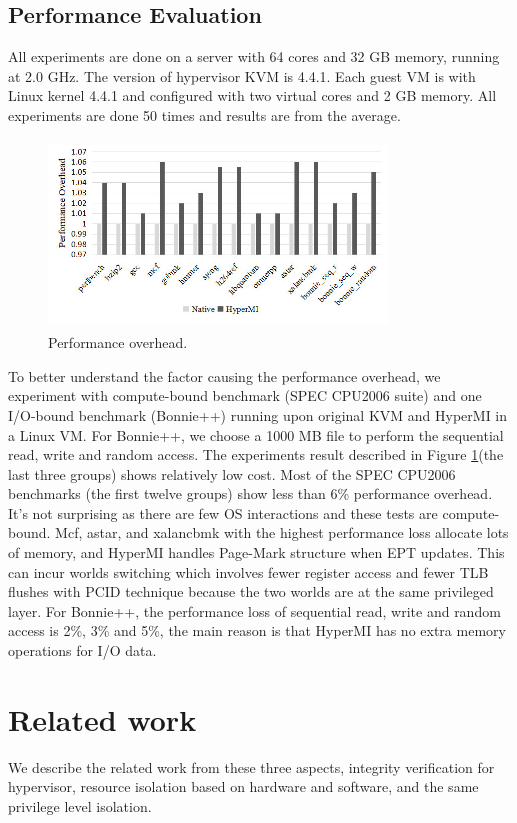 \documentclass[conference]{IEEEtran}
\begin{document}
\subsection{Performance Evaluation}
All experiments are done on a server with 64 cores and 32 GB memory, running at 2.0 GHz. The version of hypervisor KVM is 4.4.1. Each guest VM is with Linux kernel 4.4.1 and configured with two virtual cores and 2 GB memory. All experiments are done 50 times and results are from the average.
\begin{figure}
\centerline{\includegraphics[width=9cm,height=5cm]{VMSM51.jpg}}
\caption{Performance overhead.} \label{fig5}
\end{figure}
To better understand the factor causing the performance overhead, we experiment with compute-bound benchmark (SPEC CPU2006 suite) and one I/O-bound benchmark (Bonnie++) running upon original KVM and HyperMI in a Linux VM. For Bonnie++, we choose a 1000 MB file to perform the sequential read, write and random access. The experiments result described in Figure \ref{fig5}(the last three groups) shows relatively low cost. Most of the SPEC CPU2006 benchmarks (the first twelve groups) show less than 6\% performance overhead. It's not surprising as there are few OS interactions and these tests are compute-bound. Mcf, astar, and xalancbmk with the highest performance loss allocate lots of memory, and HyperMI handles Page-Mark structure when EPT updates. This can incur worlds switching which involves fewer register access and fewer TLB flushes with PCID technique because the two worlds are at the same privileged layer. For Bonnie++, the performance loss of sequential read, write and random access is 2\%, 3\% and 5\%, the main reason is that HyperMI has no extra memory operations for I/O data. 
\section{Related work}
We describe the related work from these three aspects, integrity verification for hypervisor, resource isolation based on hardware and software, and the same privilege level isolation.
\end{document}
